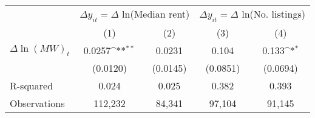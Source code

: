 {
\def\sym#1{\ifmmode^{#1}\else\(^{#1}\)\fi}
\begin{tabular}{l*{4}{c}}
\hline\hline
          &\multicolumn{2}{c}{$\Delta y_{it}=\Delta$ ln(Median rent)}&\multicolumn{2}{c}{$\Delta y_{it}=\Delta$ ln(No. listings)}\\\cmidrule(lr){2-3}\cmidrule(lr){4-5}
          &\multicolumn{1}{c}{(1)}         &\multicolumn{1}{c}{(2)}         &\multicolumn{1}{c}{(3)}         &\multicolumn{1}{c}{(4)}         \\
\hline
$\Delta \ln(MW)_{t}$&   0.0257\sym{**} &   0.0231         &    0.104         &    0.133\sym{*}  \\
          & (0.0120)         & (0.0145)         & (0.0851)         & (0.0694)         \\
\hline
R-squared &    0.024         &    0.025         &    0.382         &    0.393         \\
Observations&  112,232         &   84,341         &   97,104         &   91,145         \\
\hline\hline
\end{tabular}
}
